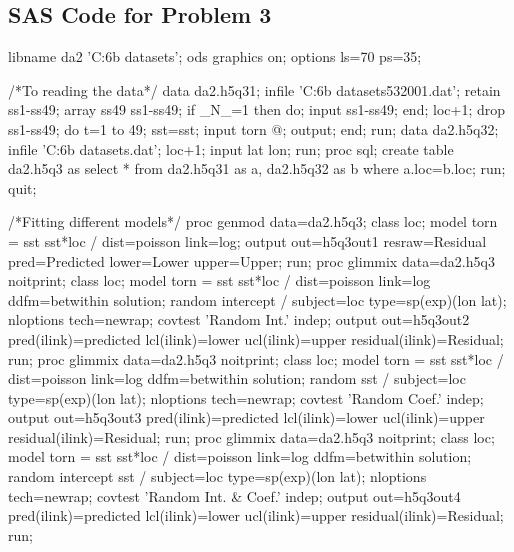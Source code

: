 \documentclass[letterpaper, 12pt]{article}
\begin{document}
\begin{appendices}
\section{SAS Code for Problem 3}
\begin{Sascode}[store=class]
libname da2 'C:\Users\psy6b\Desktop{} datasets'; 
ods graphics on; 
options ls=70 ps=35; 

/*To reading the data*/
data da2.h5q31;
   infile 'C:\Users\psy6b\Desktop{} datasets\ssttornado532001.dat';
   retain ss1-ss49;
   array ss{49} ss1-ss49;
   if _N_=1 then do; 
      input ss1-ss49;
   end;
   loc+1;
   drop ss1-ss49;
   do t=1 to 49;
      sst=ss{t};
      input torn @;
      output;
   end;
run;
data da2.h5q32;
   infile 'C:\Users\psy6b\Desktop{} datasets\MOtornlatlon.dat';
   loc+1;
   input lat lon;
   run;
proc sql;
   create table da2.h5q3
   as select * from da2.h5q31 as a, da2.h5q32 as b
   where a.loc=b.loc;
   run;
quit;

/*Fitting different models*/
proc genmod data=da2.h5q3;
   class loc;
   model torn = sst sst*loc / dist=poisson link=log;
   output out=h5q3out1 resraw=Residual pred=Predicted lower=Lower
      upper=Upper;
run;
proc glimmix data=da2.h5q3 noitprint;
   class loc;
   model torn = sst sst*loc / dist=poisson link=log ddfm=betwithin
      solution;
   random intercept / subject=loc type=sp(exp)(lon lat);
   nloptions tech=newrap;
   covtest 'Random Int.' indep;
   output out=h5q3out2 pred(ilink)=predicted lcl(ilink)=lower 
      ucl(ilink)=upper residual(ilink)=Residual;
run;
proc glimmix data=da2.h5q3 noitprint;
   class loc;
   model torn = sst sst*loc / dist=poisson link=log ddfm=betwithin 
      solution;
   random sst / subject=loc type=sp(exp)(lon lat);
   nloptions tech=newrap;
   covtest 'Random Coef.' indep;
   output out=h5q3out3 pred(ilink)=predicted lcl(ilink)=lower 
      ucl(ilink)=upper residual(ilink)=Residual;
run;
proc glimmix data=da2.h5q3 noitprint;
   class loc;
   model torn = sst sst*loc / dist=poisson link=log ddfm=betwithin 
      solution;
   random intercept sst / subject=loc type=sp(exp)(lon lat);
   nloptions tech=newrap;
   covtest 'Random Int. & Coef.' indep;
   output out=h5q3out4 pred(ilink)=predicted lcl(ilink)=lower 
      ucl(ilink)=upper residual(ilink)=Residual;
run;



\end{Sascode}
\end{appendices}
\end{document}
